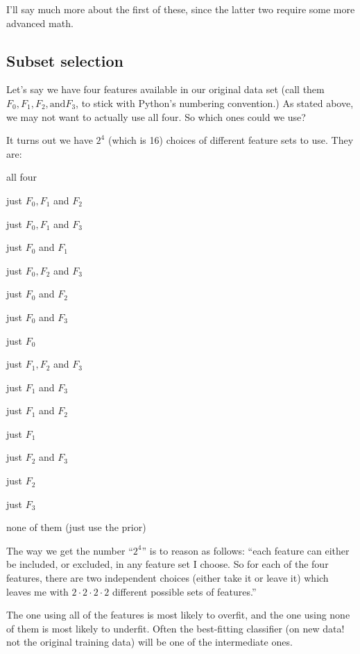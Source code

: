 \documentclass[12pt]{article}
\begin{document}
I'll say much more about the first of these, since the latter two require some
more advanced math.

\subsection{Subset selection}

Let's say we have four features available in our original data set (call them
$F_0,F_1,F_2, \textrm{and} F_3$, to stick with Python's numbering
convention.) As stated above, we may not want to actually use all four. So
which ones could we use?

It turns out we have $2^4$ (which is 16) choices of different feature sets to
use. They are:

\begin{compactitem}
\item all four
\item just $F_0,F_1$ and $F_2$
\item just $F_0,F_1$ and $F_3$
\item just $F_0$ and $F_1$
\item just $F_0,F_2$ and $F_3$
\item just $F_0$ and $F_2$
\item just $F_0$ and $F_3$
\item just $F_0$
\item just $F_1,F_2$ and $F_3$
\item just $F_1$ and $F_3$
\item just $F_1$ and $F_2$
\item just $F_1$
\item just $F_2$ and $F_3$
\item just $F_2$
\item just $F_3$
\item none of them (just use the prior)
\end{compactitem}

The way we get the number ``$2^4$'' is to reason as follows: ``each feature can
either be included, or excluded, in any feature set I choose. So for each
of the four features, there are two independent choices (either take it or
leave it) which leaves me with $2 \cdot 2 \cdot 2 \cdot 2$ different possible
sets of features.''

The one using all of the features is most likely to overfit, and the one using
none of them is most likely to underfit. Often the best-fitting classifier (on
new data! not the original training data) will be one of the intermediate
ones.
\end{document}
